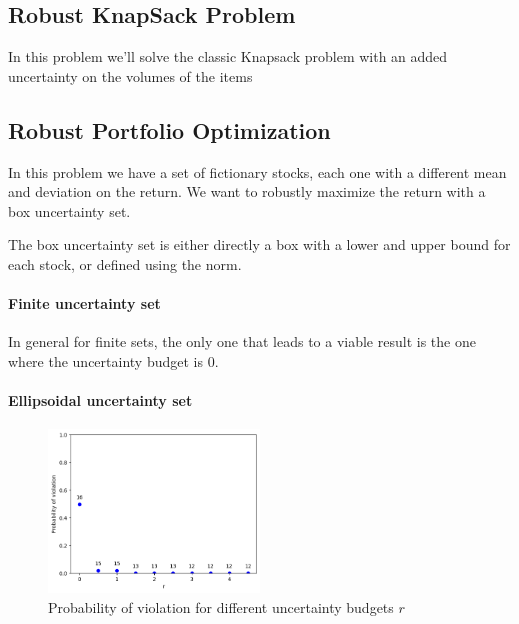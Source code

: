 \subsection{Robust KnapSack Problem}
In this problem we'll solve the classic Knapsack problem with an added uncertainty on the volumes of the items

\subsection{Robust Portfolio Optimization}
In this problem we have a set of fictionary stocks, each one with a different mean and deviation on the return.
We want to robustly maximize the return with a box uncertainty set.

The box uncertainty set is either directly a box with a lower and upper bound for each stock, or defined using the norm.

\paragraph*{Finite uncertainty set}
In general for finite sets, the only one that leads to a viable result is the one where the uncertainty budget is 0.

\paragraph*{Ellipsoidal uncertainty set}
\begin{figure}
    \centering
    \includegraphics[width=0.5\textwidth]{lab12/imgs/ellips.png}
    \caption{Probability of violation for different uncertainty budgets $r$}
    \label{fig:ellips}
\end{figure}

